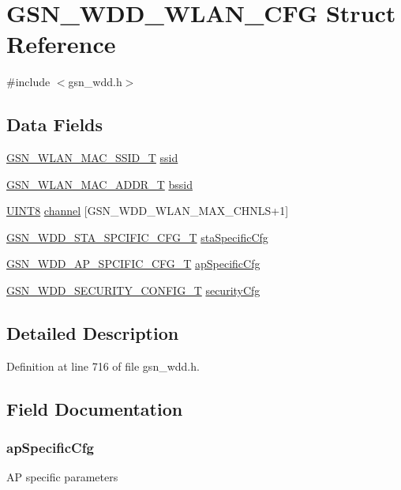 \hypertarget{a00302}{
\section{GSN\_\-WDD\_\-WLAN\_\-CFG Struct Reference}
\label{a00302}
}


{\ttfamily \#include $<$gsn\_\-wdd.h$>$}

\subsection*{Data Fields}
\begin{DoxyCompactItemize}
\item 
\hyperlink{a00417}{GSN\_\-WLAN\_\-MAC\_\-SSID\_\-T} \hyperlink{a00302_a9bcb2e5a0dbdd5461faec24950cf7459}{ssid}
\item 
\hyperlink{a00416}{GSN\_\-WLAN\_\-MAC\_\-ADDR\_\-T} \hyperlink{a00302_a1d70c2c8895c2763bdede85266c38318}{bssid}
\item 
\hyperlink{a00660_gab27e9918b538ce9d8ca692479b375b6a}{UINT8} \hyperlink{a00302_ad3776fa16ca5b00d270cd6365ac42a6f}{channel} \mbox{[}GSN\_\-WDD\_\-WLAN\_\-MAX\_\-CHNLS+1\mbox{]}
\item 
\hyperlink{a00300}{GSN\_\-WDD\_\-STA\_\-SPCIFIC\_\-CFG\_\-T} \hyperlink{a00302_ad38e865ab1c2d66e9b528b45c22261f4}{staSpecificCfg}
\item 
\hyperlink{a00271}{GSN\_\-WDD\_\-AP\_\-SPCIFIC\_\-CFG\_\-T} \hyperlink{a00302_ac11f5bc5f88979886ff0ae78024b977f}{apSpecificCfg}
\item 
\hyperlink{a00297}{GSN\_\-WDD\_\-SECURITY\_\-CONFIG\_\-T} \hyperlink{a00302_a1d473196c90a81dd38d88c8cf69b32bf}{securityCfg}
\end{DoxyCompactItemize}


\subsection{Detailed Description}


Definition at line 716 of file gsn\_\-wdd.h.



\subsection{Field Documentation}
\hypertarget{a00302_ac11f5bc5f88979886ff0ae78024b977f}{
\subsubsection[{apSpecificCfg}]{ {\bf apSpecificCfg}}}
\label{a00302_ac11f5bc5f88979886ff0ae78024b977f}
AP specific parameters 

